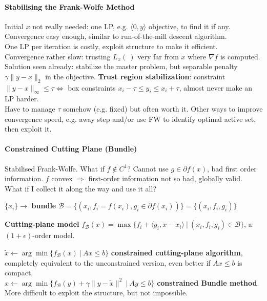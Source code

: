 \documentclass[10pt]{report}
\begin{document}
\paragraph{Stabilising the Frank-Wolfe Method} Initial $x$ not really needed: one LP, e.g. $\langle 0,y\rangle$ objective, to find it if any.\\
Convergence easy enough, similar to run-of-the-mill descent algorithm.\\
One LP per iteration is costly, exploit structure to make it efficient.\\
Convergence rather slow: trusting $L_x(\:)$ very far from $x$ where $\nabla f$ is computed.\\
Solution seen already: stabilize the master problem, but separable penalty $\gamma\|y-x\|_2$ in the objective. \textbf{Trust region stabilization}: constraint $\|y-x\|_\infty \leq \tau\Leftrightarrow$ box constraints $x_i-\tau\leq y_i\leq x_i+\tau$, almost never make an LP harder.\\
Have to manage $\tau$ somehow (e.g. fixed) but often worth it. Other ways to improve convergence speed, e.g. away step and/or use FW to identify optimal active set, then exploit it.
\paragraph{Constrained Cutting Plane (Bundle)} Stabilised Frank-Wolfe. What if $f\not\in C^1$? Cannot use $g\in\partial f(x)$, bad first order information. $f$ convex $\Rightarrow$ first-order information not so bad, globally valid.\\
What if I collect it along the way and use it all?
\begin{list}{}{}
	\item $\{x_i\}\rightarrow$ \textbf{bundle} $\mathscr{B}=\{(x_i, f_i = f(x_i), g_i\in\partial f(x_i))\} = \{(x_i, f_i, g_i)\}$
	\item \textbf{Cutting-plane model} $f_\mathscr{B}(x) = \max\{f_i+\langle g_i, x-x_i\rangle\:|\:(x_i, f_i, g_i)\in \mathscr{B}\}$, a $(1+\epsilon)$-order model.
\end{list}
$\tilde{x}\leftarrow \arg\min\{f_\mathscr{B}(x)\:|\:Ax\leq b\}$ \textbf{constrained cutting-plane algorithm}, completely equivalent to the unconstrained version, even better if $Ax\leq b$ is compact.\\
$x\leftarrow \arg\min\{f_\mathscr{B}(y)+\gamma\|y-\tilde{x}\|^2\:|\:Ay\leq b\}$ \textbf{constrained Bundle method}.\\
More difficult to exploit the structure, but not impossible.
\end{document}
